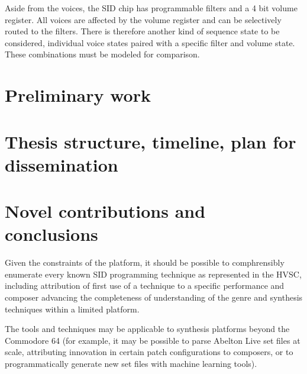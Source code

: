 \documentclass[10pt]{article}
\begin{document}
\begin{multicols*}{2}
  Aside from the voices, the SID chip has programmable filters and
  a 4 bit volume register. All voices are affected by the volume
  register and can be selectively routed to the filters. There is
  therefore another kind of sequence state to be considered,
  individual voice states paired with a specific filter and volume
  state. These combinations must be modeled for comparison.


\section{Preliminary work}

\section{Thesis structure, timeline, plan for dissemination}

\section{Novel contributions and conclusions}

Given the constraints of the platform, it should be possible to
comphrensibly enumerate every known SID programming technique as
represented in the HVSC, including attribution of first use of a
technique to a specific performance and composer advancing the
completeness of understanding of the genre and synthesis techniques
within a limited platform.

The tools and techniques may be applicable to synthesis platforms
beyond the Commodore 64 (for example, it may be possible to parse
Abelton Live set files at scale, attributing innovation in certain
patch configurations to composers, or to programmatically
generate new set files with machine learning tools).





\end{multicols*}
\end{document}

